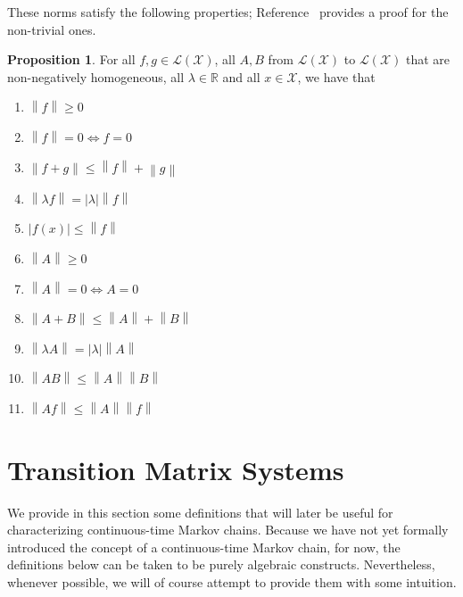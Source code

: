 \documentclass[10pt,a4paper]{paper}
\theoremstyle{definition}
\newtheorem{proposition}[theorem]{Proposition}
\newcommand{\reals}{\mathbb{R}}
\newcommand{\states}{\mathcal{X}}
\newcommand{\gambles}{\mathcal{L}}
\newcommand{\gamblesX}{\gambles(\states)}
\newcommand{\asa}{\Leftrightarrow}
\newcommand{\norm}[1]{\left\lVert #1 \right\rVert}
\newcommand{\abs}[1]{\left\vert #1 \right\vert}
\begin{document}
These norms satisfy the following properties; Reference~\cite{DeBock:2016} provides a proof for the non-trivial ones.

\begin{proposition}\label{prop:norm_properties}
For all $f,g\in\gamblesX$, all $A,B$ from $\gamblesX$ to $\gamblesX$ that are non-negatively homogeneous, all $\lambda\in\reals$ and all $x\in\states$, we have that
\vspace{5pt}

\begin{multicols}{2}
\begin{enumerate}[label=N\arabic*:,ref=N\arabic*]
\item
$\norm{f}\geq0$
\item
$\norm{f}=0\asa f=0$
\item
$\norm{f+g}\leq\norm{f}+\norm{g}$
\item
$\norm{\lambda f}=\abs{\lambda}\norm{f}$
\item
$\abs{f(x)}\leq\norm{f}$ \\
\item
$\norm{A}\geq0$
\item
$\norm{A}=0\asa A=0$
\item
$\norm{A+B}\leq\norm{A}+\norm{B}$
\item\label{N:homogeneous}
$\norm{\lambda A}=\abs{\lambda}\norm{A}$
\item\label{N:normAB}
$\norm{AB}\leq\norm{A}\norm{B}$
\item\label{N:normAf}
$\norm{Af}\leq\norm{A}\norm{f}$
\end{enumerate}
\end{multicols}
\end{proposition}

\section{Transition Matrix Systems}\label{sec:systems}

We provide in this section some definitions that will later be useful for characterizing continuous-time Markov chains. Because we have not yet formally introduced the concept of a continuous-time Markov chain, for now, the definitions below can be taken to be purely algebraic constructs. Nevertheless, whenever possible, we will of course attempt to provide them with some intuition.

\end{document}
